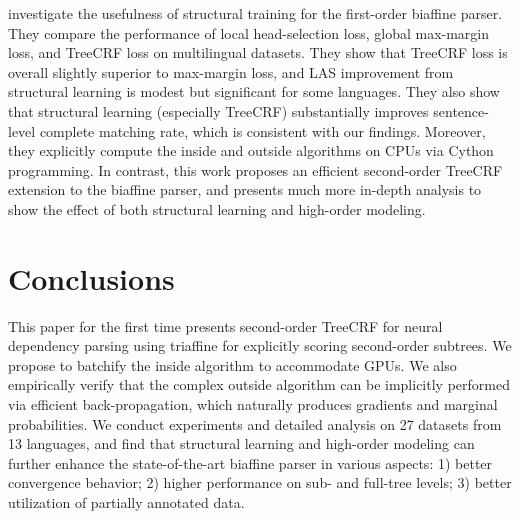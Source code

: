 \documentclass[11pt,a4paper]{article}
\begin{document}
\citet{zhang-etal-2019-empirical} investigate the usefulness of structural training for the first-order biaffine parser.
They compare the performance of local head-selection loss, global max-margin loss, and TreeCRF loss on multilingual datasets.
They show that TreeCRF loss is overall slightly superior to max-margin loss, and LAS improvement from  structural learning is modest but significant for some languages.
They also show that structural learning (especially TreeCRF) substantially improves sentence-level complete matching rate, which is consistent with our findings.
Moreover, they explicitly compute the inside and outside algorithms on CPUs via Cython programming.
In contrast, this work proposes an efficient second-order TreeCRF extension to the biaffine parser,
and presents much more in-depth analysis to show the effect of both structural learning and high-order modeling.
































%
 \section{Conclusions}
\label{section:conclusions}


This paper for the first time presents second-order TreeCRF for neural dependency parsing using triaffine for explicitly scoring second-order subtrees.
We propose to batchify the inside algorithm to accommodate GPUs.
We also empirically verify that the complex outside algorithm can be implicitly performed via efficient back-propagation, which naturally produces gradients and
marginal probabilities.
We conduct experiments and detailed analysis on 27 datasets from 13 languages, and  find that structural learning and high-order modeling can further enhance  the state-of-the-art biaffine parser in various aspects: 1) better convergence behavior; 2) higher performance on sub- and full-tree levels; 3)
 better utilization of partially annotated data.
\end{document}
